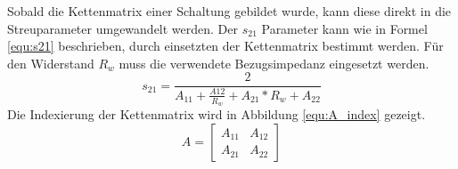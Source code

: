 Sobald die Kettenmatrix einer Schaltung gebildet wurde, kann diese direkt in die Streuparameter umgewandelt werden. Der $s_{21}$ Parameter kann wie in Formel \ref{equ:s21} beschrieben, durch einsetzten der Kettenmatrix bestimmt werden. Für den Widerstand $R_w$ muss die verwendete Bezugsimpedanz eingesetzt werden.
\begin{equation}\label{equ:s21}
s_{21} = \frac{2}{A_{11}+\frac{A{12}}{R_w}+A_{21}*R_w+A_{22}}
\end{equation}
Die Indexierung der Kettenmatrix wird in Abbildung \ref{equ:A_index} gezeigt.
\begin{equation}\label{equ:A_index}
	A = \left[\begin{matrix}
	A_{11}&A_{12}\\A_{21}&A_{22}
	\end{matrix}\right]
\end{equation}
\newpage
